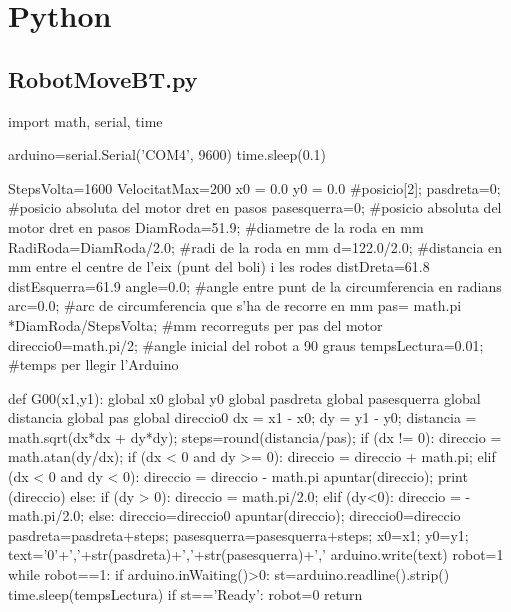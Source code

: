 

\section{Python}

\subsection{RobotMoveBT.py}
\begin{python}
	import math, serial, time
	
	arduino=serial.Serial('COM4', 9600)
	time.sleep(0.1)
	
	StepsVolta=1600
	VelocitatMax=200
	x0 = 0.0
	y0 = 0.0
	#posicio[2];
	pasdreta=0; #posicio absoluta del motor dret en pasos
	pasesquerra=0; #posicio absoluta del motor dret en pasos
	DiamRoda=51.9; #diametre de la roda en mm
	RadiRoda=DiamRoda/2.0; #radi de la roda en mm
	d=122.0/2.0; #distancia en mm entre el centre de l'eix (punt del boli) i les rodes
	distDreta=61.8
	distEsquerra=61.9
	angle=0.0; #angle entre punt de la circumferencia en radians
	arc=0.0; #arc de circumferencia que s'ha de recorre en mm
	pas= math.pi *DiamRoda/StepsVolta; #mm recorreguts per pas del motor
	direccio0=math.pi/2; #angle inicial del robot a 90 graus
	tempsLectura=0.01; #temps per llegir l'Arduino
	
	
	def G00(x1,y1):
		global x0
		global y0
		global pasdreta
		global pasesquerra
		global distancia
		global pas
		global direccio0
		dx = x1 - x0;
		dy = y1 - y0;
		distancia = math.sqrt(dx*dx + dy*dy);
		steps=round(distancia/pas);
		if (dx != 0):
			direccio = math.atan(dy/dx);
			if (dx < 0 and dy >= 0):
				direccio = direccio + math.pi;
			elif (dx < 0 and dy < 0):
				direccio = direccio - math.pi
			apuntar(direccio);
			print (direccio)
		else:
			if (dy > 0):
				direccio = math.pi/2.0;
			elif (dy<0):
				direccio = -math.pi/2.0;
			else:
				direccio=direccio0
			apuntar(direccio);
		direccio0=direccio
		pasdreta=pasdreta+steps;
		pasesquerra=pasesquerra+steps;
		x0=x1;
		y0=y1;
		text='0'+','+str(pasdreta)+','+str(pasesquerra)+','
		arduino.write(text)
		robot=1
		while robot==1:
			if arduino.inWaiting()>0:
				st=arduino.readline().strip()
				time.sleep(tempsLectura)
				if st=='Ready':
					robot=0
		return
	

\end{python}
